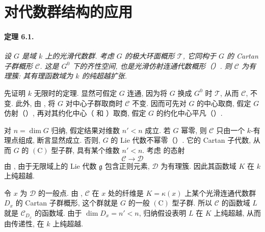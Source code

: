 \section{对代数群结构的应用}

\paragraph{\textbf{定理 6.1.}}
{\itshape 设 \(G\) 是域 \(k\) 上的光滑代数群. 考虑 \(G\) 的极大环面概形 \(\mathcal T\), 它同构于 \(G\) 的 Cartan 子群概形 \(\mathcal C\). 这是 \(G^0\) 下的齐性空间, 也是光滑仿射连通代数概形\textup{（\textup{}）}. 则 \(\mathcal C\) 为有理簇: 其有理函数域为 \(k\) 的纯超越扩张.}

先证明 \(k\) 无限时的定理. 显然可假定 \(G\) 连通, 因为将 \(G\) 换成 \(G^0\) 时 \(\mathcal T\), 从而 \(\mathcal C\), 不变. 此外, 由 , 将 \(G\) 对中心子群取商时 \(\mathcal C\) 不变. 因而可先对 \(G\) 的中心取商, 假定 \(G\) 仿射\textup{（）}, 再对其约化中心\textup{（ 和 ）}取商, 假定 \(G\) 的约化中心平凡\textup{（\textup{}）}.

对 \(n=\dim G\) 归纳, 假定结果对维数 \(n'<n\) 成立. 若 \(G\) 幂零, 则 \(\mathcal C\) 只由一个 \(k\)-有理点组成, 断言显然成立. 否则, \(G\) 的 Lie 代数不幂零\textup{（）}. 它的 Cartan 子代数, 从而 \(G\) 的 \((\mathrm C)\) 型子群, 具有某个维数 \(n'<n\). 考虑  的态射
\[
  \mathcal C\longrightarrow\mathcal D
\]
由 , 由于无限域上的 Lie 代数 \(\mathfrak g\) 包含正则元素, \(\mathcal D\) 为有理簇. 因此其函数域 \(K\) 在 \(k\) 上纯超越.

令 \(x\) 为 \(\mathcal D\) 的一般点. 由 , \(\mathcal C\) 在 \(x\) 处的纤维是 \(K=\kappa(x)\) 上某个光滑连通代数群 \(D_x\) 的 Cartan 子群概形, 这个群就是 \(G\) 的一般 \((\mathrm C)\) 型子群. 所以 \(\mathcal C\) 的函数域 \(L\) 就是 \(\mathcal C_{D_x}\) 的函数域. 由于 \(\dim D_x=n'<n\), 归纳假设表明 \(L\) 在 \(K\) 上纯超越, 从而由传递性, 在 \(k\) 上纯超越.

